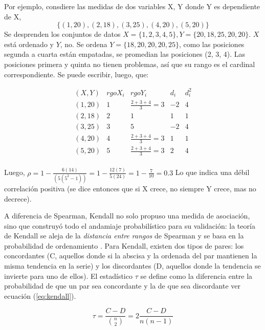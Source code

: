 \documentclass[12pt, letter paper]{report}
\begin{document}
        Por ejemplo, consdiere las medidas de dos variables X, Y donde Y es
        dependiente de X, $$\{(1, 20), (2, 18), (3, 25), (4, 20), (5, 20)\}$$
        Se desprenden los conjuntos de datos $X = \{1, 2, 3, 4, 5\}, Y =
        \{20, 18, 25, 20, 20\}$. $X$ está ordenado y $Y$, no. Se ordena $Y = \{
        18, 20, 20, 20, 25\}$, como las posiciones segunda a cuarta están
        empatadas, se promedian las posiciones (2, 3, 4). Las posiciones primera
        y quinta no tienen problemas, así que su rango es el cardinal
        correspondiente. Se puede escribir, luego, que:

        $$\begin{matrix}
          (X, Y)  & rgo X_i &         rgo Y_i         & d_i & d_i^2 \\
          (1, 20) &    1    & \frac{2 + 3 + 4}{3} = 3 & -2  &   4   \\
          (2, 18) &    2    &            1            &  1  &   1   \\
          (3, 25) &    3    &            5            & -2  &   4   \\
          (4, 20) &    4    & \frac{2 + 3 + 4}{3} = 3 &  1  &   1   \\
          (5, 20) &    5    & \frac{2 + 3 + 4}{3} = 3 &  2  &   4   \\
        \end{matrix}$$

        Luego, $\rho = 1 - \frac{6(14)}{(5(5^2 - 1))} = 1 - \frac{12(7)}{5(24)}
        = 1 - \frac{7}{10} = \num{0,3}$ Lo que indica una débil correlación
        positiva (se dice entonces que si X crece, no siempre Y crece, mas no
        decrece).

        A diferencia de Spearman, Kendall no solo propuso una medida de
        asociación, sino que construyó todo el andamiaje probabilístico para su
        validación: la teoría de Kendall se aleja de la \textit{distancia entre
        rangos} de Spearman y se basa en la probabilidad de ordenamiento
        \cite{kendall1938new}. Para Kendall, existen dos tipos de pares: los
        concordantes (C, aquellos donde si la abscisa y la ordenada del par
        mantienen la misma tendencia en la serie) y los discordantes (D,
        aquellos donde la tendencia se invierte para uno de ellos). El
        estadístico $\tau$ se define como la diferencia entre la probabilidad de
        que un par sea concordante y la de que sea discordante ver ecuación
        (\ref{eq:kendall}).

        \begin{equation}
          \tau = \dfrac{C - D}{\displaystyle \binom{n}{2}} =
          2 \frac{C - D}{n(n - 1)}
          \label{eq:kendall}
        \end{equation}
\end{document}
